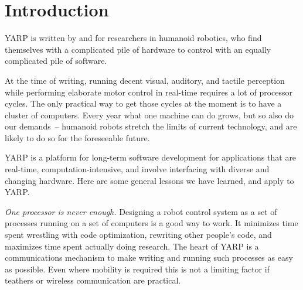 \section{Introduction}

YARP is written by and for researchers in humanoid robotics, who find
themselves with a complicated pile of hardware to control with an
equally complicated pile of software.

%
At the time of writing, running decent visual, auditory, and tactile
perception while performing elaborate motor control in real-time
requires a lot of processor cycles. The only practical way to get
those cycles at the moment is to have a cluster of computers. Every
year what one machine can do grows, but so also do our demands~--
humanoid robots stretch the limits of current technology, and are
likely to do so for the foreseeable future.
%

YARP is a platform for long-term software development for applications
that are real-time, computation-intensive, and involve interfacing 
with diverse and changing hardware.
%
Here are some general lessons we have learned, and apply to YARP.

\emph {One processor is never enough.}
Designing a robot control system as a set of processes running on a
set of computers is a good way to work. It minimizes time spent wrestling with
code optimization, rewriting other people's code, and maximizes
time spent actually doing research.  The heart of YARP is a
communications mechanism to make writing and running such processes as
easy as possible. Even where mobility is required this is not a limiting
factor if teathers or wireless communication are practical.

